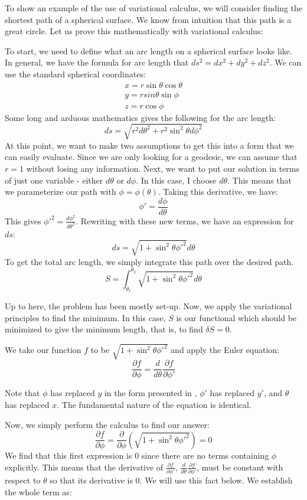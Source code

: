 \begin{example}\label{ex:geodesic}
To show an example of the use of variational calculus, we will consider finding the shortest path of a spherical surface. We know from intuition that this path is a great circle. Let us prove this mathematically with variational calculus:

To start, we need to define what an arc length on a spherical surface looks like. In general, we have the formula for arc length that $ds^2=dx^2+dy^2+dz^2$. We can use the standard spherical coordinates:
    $$\begin{array}{l}
        x=r\sin\theta\cos\theta\\
        y=rsin\theta\sin\phi\\
        z=r\cos\phi
    \end{array}$$
Some long and arduous mathematics gives the following for the arc length:
$$ds=\sqrt{r^2d\theta^2+r^2\sin^2\theta d\phi^2}$$
At this point, we want to make two assumptions to get this into a form that we can easily evaluate. Since we are only looking for a \gls{geodesic}, we can assume that $r=1$ without losing any information. Next, we want to put our solution in terms of just one variable - either $d\theta$ or $d\phi$. In this case, I choose $d\theta$. This means that we parameterize our path with $\phi=\phi(\theta)$. Taking this derivative, we have:
$$\phi'=\frac{d\phi}{d\theta}$$
This gives ${\phi'}^2=\frac{d\phi^2}{d\theta^2}$. Rewriting with these new terms, we have an expression for $ds$:
$$ds=\sqrt{1+\sin^2\theta{\phi'}^2}d\theta$$
To get the total arc length, we simply integrate this path over the desired path.
$$S=\int_{\theta_1}^{\theta_2}{\sqrt{1+\sin^2\theta{\phi'}^2}d\theta}$$

Up to here, the problem has been mostly set-up. Now, we apply the variational principles to find the minimum. In this case, $S$ is our functional which should be minimized to give the minimum length, that is, to find $\delta S=0$.

We take our function $f$ to be $\sqrt{1+\sin^2\theta{\phi'}^2}$ and apply the Euler equation:
$$\frac{\partial f}{\partial \phi}=\frac{d}{d\theta}\frac{\partial f}{\partial \phi'}$$

Note that $\phi$ has replaced $y$ in the form presented in , $\phi'$ has replaced $y'$, and $\theta$ has replaced $x$. The fundamental nature of the equation is identical.

Now, we simply perform the calculus to find our answer:
$$\frac{\partial f}{\partial \phi}=\frac{\partial}{\partial\phi}\left(\sqrt{1+\sin^2\theta{\phi'}^2}\right)=0$$
We find that this first expression is 0 since there are no terms containing $\phi$ explicitly. This means that the derivative of $\frac{\partial f}{\partial \phi'}$, $\frac{d}{d\theta}\frac{\partial f}{\partial \phi'}$, must be constant with respect to $\theta$ so that its derivative is 0. We will use this fact below. We establish the whole term as:


\end{example}
